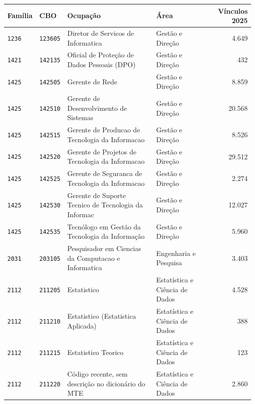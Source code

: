 \begin{quadro}[htbp]
    \centering
    \caption{Códigos CBO do recorte de tecnologia observados no estoque de 2025}
    \label{quadro:cbos}
    \scriptsize
    \renewcommand{\arraystretch}{1.15}
    \begin{tabular}{llp{6.2cm}p{3.4cm}r}
        \toprule
        \rowcolor{black!8}
        \textbf{Família} & \textbf{CBO} & \textbf{Ocupação} & \textbf{Área} & \textbf{Vínculos 2025} \\
        \midrule
        \texttt{1236} & \texttt{123605} & Diretor de Servicos de Informatica & Gestão e Direção & 4.649 \\
        \texttt{1421} & \texttt{142135} & Oficial de Proteção de Dados Pessoais (DPO) & Gestão e Direção & 432 \\
        \texttt{1425} & \texttt{142505} & Gerente de Rede & Gestão e Direção & 8.859 \\
        \texttt{1425} & \texttt{142510} & Gerente de Desenvolvimento de Sistemas & Gestão e Direção & 20.568 \\
        \texttt{1425} & \texttt{142515} & Gerente de Producao de Tecnologia da Informacao & Gestão e Direção & 8.526 \\
        \texttt{1425} & \texttt{142520} & Gerente de Projetos de Tecnologia da Informacao & Gestão e Direção & 29.512 \\
        \texttt{1425} & \texttt{142525} & Gerente de Seguranca de Tecnologia da Informacao & Gestão e Direção & 2.274 \\
        \texttt{1425} & \texttt{142530} & Gerente de Suporte Tecnico de Tecnologia da Informac & Gestão e Direção & 12.027 \\
        \texttt{1425} & \texttt{142535} & Tecnólogo em Gestão da Tecnologia da Informação & Gestão e Direção & 5.960 \\
        \texttt{2031} & \texttt{203105} & Pesquisador em Ciencias da Computacao e Informatica & Engenharia e Pesquisa & 3.403 \\
        \texttt{2112} & \texttt{211205} & Estatistico & Estatística e Ciência de Dados & 4.528 \\
        \texttt{2112} & \texttt{211210} & Estatistico (Estatistica Aplicada) & Estatística e Ciência de Dados & 388 \\
        \texttt{2112} & \texttt{211215} & Estatistico Teorico & Estatística e Ciência de Dados & 123 \\
        \texttt{2112} & \texttt{211220} & Código recente, sem descrição no dicionário do MTE & Estatística e Ciência de Dados & 2.860 \\

\end{tabular}
\end{quadro}
